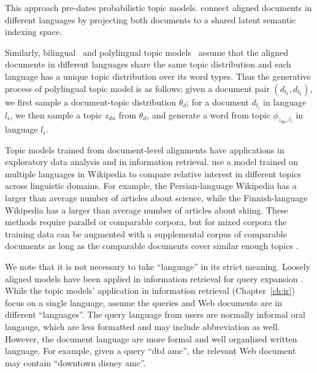 This approach pre-dates probabilistic topic models.
\citet{Landauer-1990} connect aligned documents in different languages
by projecting both documents to a shared latent semantic indexing
space.

Similarly, bilingual~\citep{zhao-06} and polylingual topic models~\citep[\plda{}]{mimno-09}
assume that the aligned documents in different languages share the
same topic distribution and each language has a unique topic
distribution over its word types.
Thus the generative process of polylingual topic model is as follows:
given a document pair $(d_{l_1}, d_{l_2})$, we first sample a
document-topic distribution $\theta_d$; for a document $d_{l_i}$ in
language $l_i$, we then sample a topic $z_{dn}$ from $\theta_d$, and
generate a word from topic $\phi_{z_{dn}, l_i}$ in language $l_i$.

Topic models trained from document-level alignments have applications in exploratory data analysis and in information retrieval.
\citet{mimno-09} use a model trained on multiple languages in Wikipedia to compare relative interest in different topics across linguistic domains.
For example, the Persian-language Wikipedia has a larger than average number of articles about science, while the Finnish-language Wikipedia has a larger than average number of articles about skiing.
These methods require parallel or comparable corpora, but for mixed corpora the training data can be augmented with a supplemental corpus of comparable documents as long as  the comparable documents cover similar enough topics \citep{mimno-12b}.

We note that it is not necessary to take ``language'' in its strict meaning.
Loosely aligned models have been applied in information retrieval for query expansion \citep{Gao-2011,Gao-2012}. 
While the topic models' application in information retrieval (Chapter~\ref{ch:ir}) focus
on a single language, \cite{Gao-2011} assume the queries and Web documents are in
different ``languages''. The query language from users are normally informal oral langauge, 
which are less formatted and may include abbreviation as well. However, the document language
are more formal and well organlized written language. For example, given a query ``dtd amc'',
the relevant Web document may contain ``downtown disney amc''.~\citep{Jiang-2016} 

